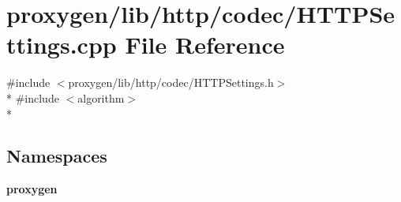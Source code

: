 \section{proxygen/lib/http/codec/\+H\+T\+T\+P\+Settings.cpp File Reference}
\label{HTTPSettings_8cpp}
{\ttfamily \#include $<$proxygen/lib/http/codec/\+H\+T\+T\+P\+Settings.\+h$>$}\\*
{\ttfamily \#include $<$algorithm$>$}\\*
\subsection*{Namespaces}
\begin{DoxyCompactItemize}
\item 
 {\bf proxygen}
\end{DoxyCompactItemize}

